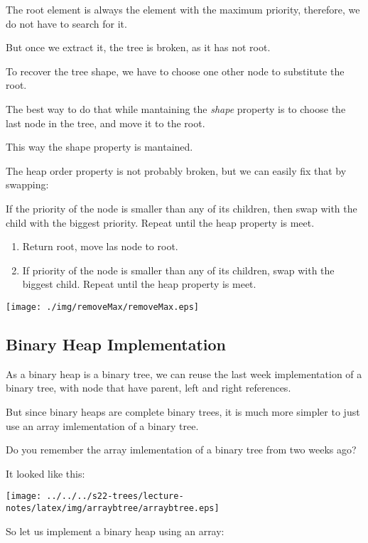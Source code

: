\documentclass[a4paper, 9pt]{extarticle}
\begin{document}
\begin{multicols}{2}

The root element is always the element with the maximum priority, therefore, we
do not have to search for it.

But once we extract it, the tree is broken, as it has not root.

To recover the tree shape, we have to choose one other node to substitute the root.

The best way to do that while mantaining the \emph{shape} property is to choose
the last node in the tree, and move it to the root.

This way the shape property is mantained.

The heap order property is not probably broken, but we can easily fix that by swapping:

If the priority of the node is smaller than any of its children, then swap with
the child with the biggest priority. Repeat until the heap property is meet.

\begin{enumerate}

  \item Return root, move las node to root.

  \item If priority of the node is smaller than any of its children,
    swap with the biggest child. Repeat until the heap property is meet.

\end{enumerate}
\columnbreak
\begin{center}
  \texttt{[image: ./img/removeMax/removeMax.eps]}
\end{center}
\end{multicols}


\subsection{Binary Heap Implementation}

As a binary heap is a binary tree, we can reuse the last week implementation of
a binary tree, with node that have parent, left and right references.

But since binary heaps are complete binary trees, it is much more simpler to
just use an array imlementation of a binary tree.

Do you remember the array imlementation of a binary tree from two weeks ago?

It looked like this:

\begin{center}
  \texttt{[image: ../../../s22-trees/lecture-notes/latex/img/arraybtree/arraybtree.eps]}
\end{center}

So let us implement a binary heap using an array:

\end{document}
